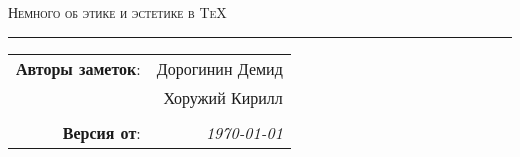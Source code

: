 
\begin{center}
    \LARGE \textsc{Немного об этике и эстетике в \texorpdfstring{\TeX}{ТеХ}}
\end{center}

\hrule

\phantom{42}

\begin{flushright}
    \begin{tabular}{rr}
        \textbf{Авторы заметок}: 
        & Дорогинин Демид \\
        & Хоружий Кирилл \\
        & \\
        \textbf{Версия от}: &
        \textit{\today}\\
    \end{tabular}
\end{flushright}

\thispagestyle{empty}
\tableofcontents

